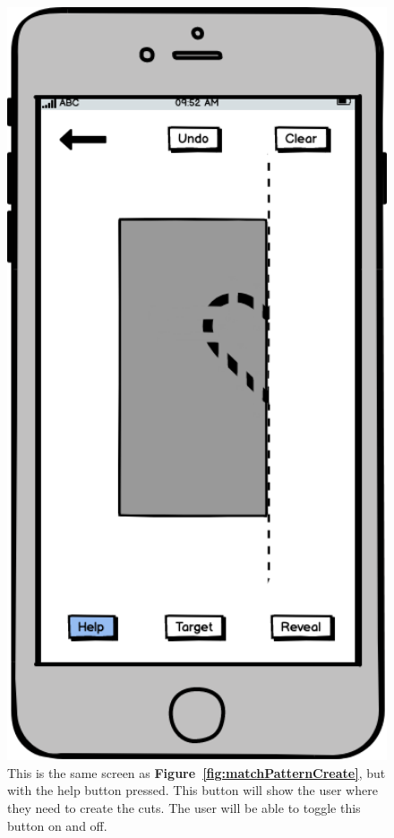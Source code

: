 \documentclass[11pt]{article}
\begin{document}
            \begin{figure}
                \begin{minipage}[c]{0.35\textwidth}
                \includegraphics[width=1\textwidth]{Images/Prototype/prototypeMatchPatternCreateHelp}
                \end{minipage}\hfill
                \begin{minipage}[c]{0.65\textwidth}
                \caption{This is the same screen as \textbf{Figure~\ref{fig:matchPatternCreate}}, but with the help button pressed. This button will show the user where they need to create the cuts. The user will be able to toggle this button on and off.}
                \label{fig:matchPatternCreateHelp}
                \end{minipage}
            \end{figure}
            
\end{document}
